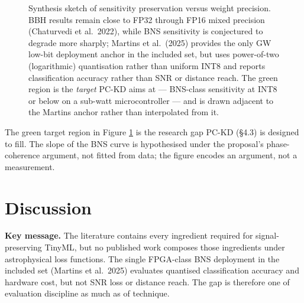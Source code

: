 \documentclass[11pt,a4paper]{article}
\begin{document}
\begin{figure}[!htbp]
\caption{Synthesis sketch of sensitivity preservation versus weight precision. BBH results remain close to FP32 through FP16 mixed precision (Chaturvedi et al.\ 2022), while BNS sensitivity is conjectured to degrade more sharply; Martins et al.\ (2025) provides the only GW low-bit deployment anchor in the included set, but uses power-of-two (logarithmic) quantisation rather than uniform INT8 and reports classification accuracy rather than SNR or distance reach. The green region is the \textit{target} PC-KD aims at — BNS-class sensitivity at INT8 or below on a sub-watt microcontroller — and is drawn adjacent to the Martins anchor rather than interpolated from it.}
\label{fig:bitwidth}
\end{figure}

\noindent The green target region in Figure \ref{fig:bitwidth} is the research gap PC-KD (\S4.3) is designed to fill. The slope of the BNS curve is hypothesised under the proposal's phase-coherence argument, not fitted from data; the figure encodes an argument, not a measurement.

\FloatBarrier

\section{Discussion}

\noindent\textbf{Key message.} The literature contains every ingredient required for signal-preserving TinyML, but no published work composes those ingredients under astrophysical loss functions. The single FPGA-class BNS deployment in the included set (Martins et al.\ 2025) evaluates quantised classification accuracy and hardware cost, but not SNR loss or distance reach. The gap is therefore one of evaluation discipline as much as of technique.
\end{document}

